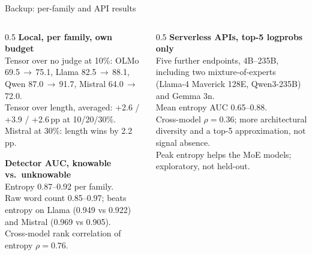 \documentclass[aspectratio=169,10pt]{beamer}
\begin{document}
\begin{frame}{Backup: per-family and API results}
  \small
  \begin{columns}[T]
    \begin{column}{0.5\textwidth}
      \textbf{Local, per family, own budget}\\
      Tensor over no judge at 10\%: OLMo 69.5\,$\to$\,75.1, Llama
      82.5\,$\to$\,88.1, Qwen 87.0\,$\to$\,91.7, Mistral 64.0\,$\to$\,72.0.\\
      Tensor over length, averaged: +2.6 / +3.9 / +2.6\,pp at 10/20/30\%.\\
      Mistral at 30\%: length wins by 2.2\,pp.

      \vspace{0.4em}
      \textbf{Detector AUC, knowable vs.\ unknowable}\\
      Entropy 0.87--0.92 per family.\\
      Raw word count 0.85--0.97; beats entropy on Llama (0.949 vs 0.922) and
      Mistral (0.969 vs 0.905).\\
      Cross-model rank correlation of entropy $\rho = 0.76$.
    \end{column}
    \begin{column}{0.5\textwidth}
      \textbf{Serverless APIs, top-5 logprobs only}\\
      Five further endpoints, 4B--235B, including two mixture-of-experts
      (Llama-4 Maverick 128E, Qwen3-235B) and Gemma 3n.\\
      Mean entropy AUC 0.65--0.88.\\
      Cross-model $\rho = 0.36$; more architectural diversity and a top-5
      approximation, not signal absence.\\
      Peak entropy helps the MoE models; exploratory, not held-out.
    \end{column}
  \end{columns}
\end{frame}
\end{document}
